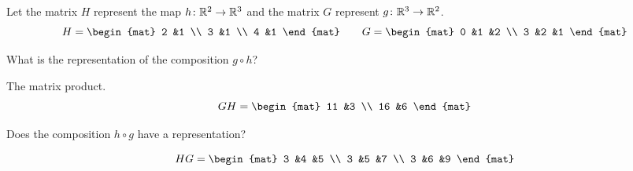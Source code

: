 \documentclass[11pt,answers]{examjh}
\begin{document}
\begin{questions}
\question
Let the matrix $H$ represent the map $\mbox{$h\colon \mathbb{R}^2\to \mathbb{R}^3$}$
and the matrix $G$ represent $\mbox{$g\colon \mathbb{R}^3\to \mathbb{R}^2$}$.
\begin{equation*}
H=
\begin{mat}
2  &1  \\
3  &1  \\
4  &1
\end{mat}
\qquad
G=
\begin{mat}
0  &1 &2  \\
3  &2 &1  
\end{mat}
\end{equation*}
\begin{parts}
\item What is the representation of the composition $g\circ h$?
\begin{solution}[1.25in]
The matrix product.
\begin{equation*}
  GH=
  \begin{mat}
  11 &3 \\
  16 &6
  \end{mat}
\end{equation*}
\end{solution}
\item Does the composition $h\circ g$ have a representation?
\begin{solution}[1.25in]
\begin{equation*}
  HG=
  \begin{mat}
  3 &4 &5 \\
  3 &5 &7 \\
  3 &6 &9
  \end{mat}
\end{equation*}
\end{solution}
\end{parts}






\end{questions}
\end{document}
